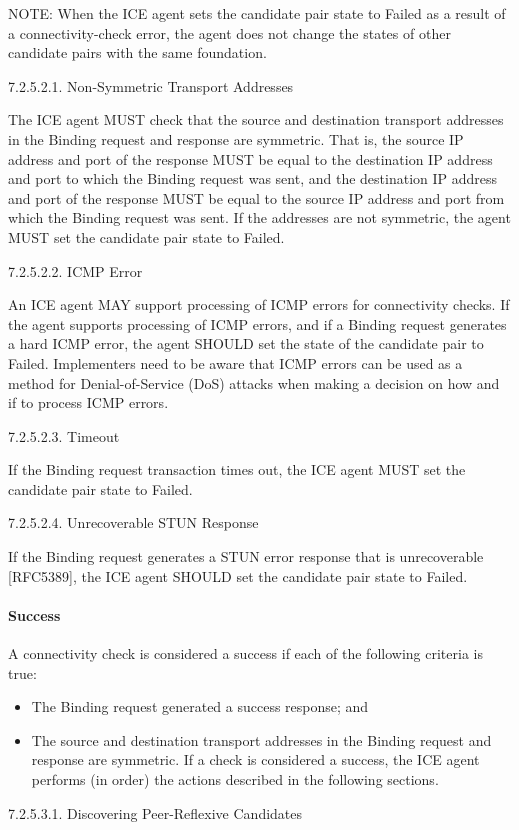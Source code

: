 \documentclass{article}
\begin{document}
NOTE: When the ICE agent sets the candidate pair state to Failed as a result of a connectivity-check error, the agent does not change the states of other candidate pairs with the same foundation.

7.2.5.2.1.  Non-Symmetric Transport Addresses

The ICE agent MUST check that the source and destination transport addresses in the Binding request and response are symmetric.  That is, the source IP address and port of the response MUST be equal to the destination IP address and port to which the Binding request was sent, and the destination IP address and port of the response MUST be equal to the source IP address and port from which the Binding request was sent.  If the addresses are not symmetric, the agent MUST set the candidate pair state to Failed.

7.2.5.2.2.  ICMP Error

An ICE agent MAY support processing of ICMP errors for connectivity checks.  If the agent supports processing of ICMP errors, and if a Binding request generates a hard ICMP error, the agent SHOULD set the state of the candidate pair to Failed.  Implementers need to be aware that ICMP errors can be used as a method for Denial-of-Service (DoS) attacks when making a decision on how and if to process ICMP errors.

7.2.5.2.3.  Timeout

If the Binding request transaction times out, the ICE agent MUST set the candidate pair state to Failed.

7.2.5.2.4.  Unrecoverable STUN Response

If the Binding request generates a STUN error response that is unrecoverable [RFC5389], the ICE agent SHOULD set the candidate pair state to Failed.

\paragraph{Success}

A connectivity check is considered a success if each of the following criteria is true:

\begin{itemize}
\item The Binding request generated a success response; and
\item The source and destination transport addresses in the Binding request and response are symmetric.
If a check is considered a success, the ICE agent performs (in order) the actions described in the following sections.

\end{itemize}
7.2.5.3.1.  Discovering Peer-Reflexive Candidates
\end{document}
